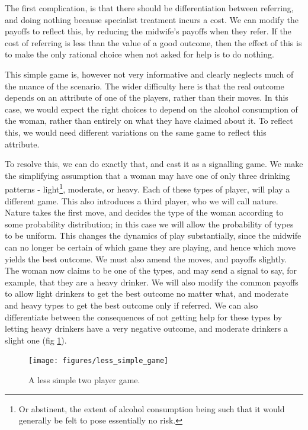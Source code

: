 The first complication, is that there should be differentiation between referring, and doing nothing because specialist treatment incurs a cost. We can modify the payoffs to reflect this, by reducing the midwife's payoffs when they refer. If the cost of referring is less than the value of a good outcome, then the effect of this is to make the only rational choice when not asked for help is to do nothing.

This simple game is, however not very informative and clearly neglects much of the nuance of the scenario. The wider difficulty here is that the real outcome depends on an attribute of one of the players, rather than their moves. In this case, we would expect the right choices to depend on the alcohol consumption of the woman, rather than entirely on what they have claimed about it.
To reflect this, we would need different variations on the same game to reflect this attribute. 

To resolve this, we can do exactly that, and cast it as a signalling game. We make the simplifying assumption that a woman may have one of only three drinking patterns - light\footnote{Or abstinent, the extent of alcohol consumption being such that it would generally be felt to pose essentially no risk.}, moderate, or heavy. Each of these types of player, will play a different game. This also introduces a third player, who we will call nature. Nature takes the first move, and decides the type of the woman according to some probability distribution; in this case we will allow the probability of types to be uniform. 
This changes the dynamics of play substantially, since the midwife can no longer be certain of which game they are playing, and hence which move yields the best outcome. We must also amend the moves, and payoffs slightly. The woman now claims to be one of the types, and may send a signal to say, for example, that they are a heavy drinker. We will also modify the common payoffs to allow light drinkers to get the best outcome no matter what, and moderate and heavy types to get the best outcome only if referred. We can also differentiate between the consequences of not getting help for these types by letting heavy drinkers have a very negative outcome, and moderate drinkers a slight one (fig \ref{fig:less_simple}).

\begin{figure}[H]
\begin{adjustbox}{center}
\texttt{[image: figures/less\_simple\_game]}
\end{adjustbox}
\caption{A less simple two player game.}

\label{fig:less_simple}
\end{figure}

